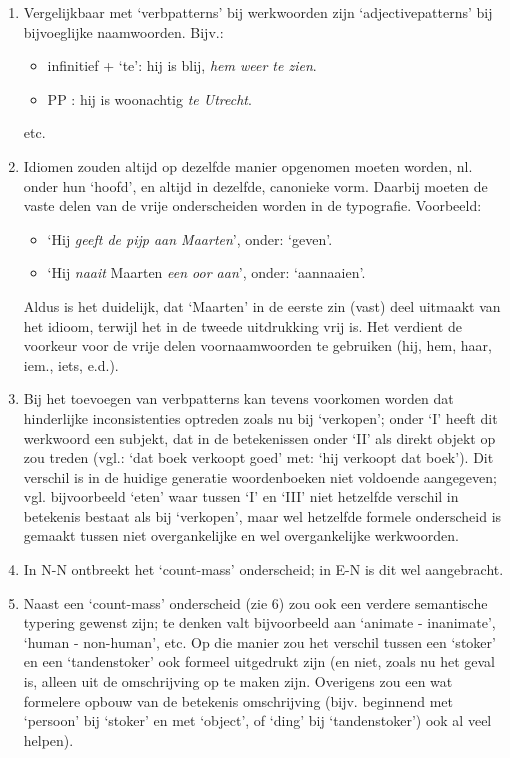 \begin{enumerate}
  \item Vergelijkbaar met `verbpatterns' bij werkwoorden zijn `adjectivepatterns' 
   bij bijvoeglijke naamwoorden. Bijv.: 

  \begin{itemize} 
       \item infinitief + `te': hij is blij, {\em hem weer te zien}.
       \item PP               : hij is woonachtig {\em te Utrecht}.
  \end{itemize}

etc.

  \item Idiomen zouden altijd op dezelfde manier opgenomen moeten worden, nl. onder
   hun `hoofd', en altijd in dezelfde, canonieke vorm. Daarbij moeten de vaste
   delen van de vrije onderscheiden worden in de typografie. Voorbeeld:

  \begin{itemize}
     \item `Hij {\em geeft de pijp aan Maarten}', onder: `geven'.
     \item `Hij {\em naait} Maarten {\em een oor aan}', onder: `aannaaien'.
  \end{itemize}

   Aldus is het duidelijk, dat `Maarten' in de eerste zin (vast) deel uitmaakt
   van het idioom, terwijl het in de tweede uitdrukking vrij is. Het verdient 
   de voorkeur voor de vrije delen voornaamwoorden te gebruiken (hij, hem, haar,
   iem., iets, e.d.). 

  \item  Bij het toevoegen van verbpatterns kan tevens voorkomen worden dat 
   hinderlijke inconsistenties optreden zoals nu bij `verkopen'; onder `I' heeft
   dit werkwoord een subjekt, dat in de betekenissen onder `II' als direkt 
   objekt op zou treden (vgl.: `dat boek verkoopt goed' met: `hij verkoopt 
   dat boek'). Dit verschil is in de huidige generatie woordenboeken niet
   voldoende aangegeven; vgl. bijvoorbeeld `eten' waar tussen `I' en `III'
   niet hetzelfde verschil in betekenis bestaat als bij `verkopen', maar wel
   hetzelfde formele onderscheid is gemaakt tussen niet overgankelijke en 
   wel overgankelijke werkwoorden. 

  \item In N-N ontbreekt het `count-mass' onderscheid; in E-N is dit wel 
aangebracht.

  \item  Naast een `count-mass' onderscheid (zie 6) zou ook een verdere 
semantische typering gewenst zijn; te denken valt bijvoorbeeld aan 
`animate - inanimate',
`human - non-human', etc. Op die manier zou het verschil tussen een `stoker' en
een `tandenstoker' ook formeel uitgedrukt zijn (en niet, zoals nu het geval
is, alleen uit de omschrijving op te maken zijn. Overigens zou een wat 
formelere opbouw van de betekenis omschrijving (bijv. beginnend met `persoon'
bij `stoker' en met `object', of `ding' bij `tandenstoker') ook al veel 
helpen). 


\end{enumerate}
